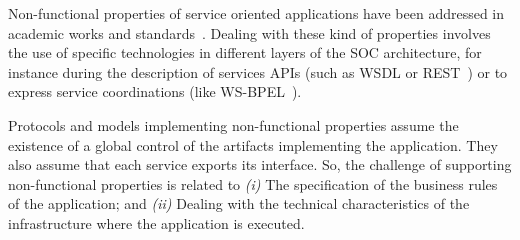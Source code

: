 \bigskip

Non-functional properties of service oriented applications have been
addressed in academic works and standards~\cite{ws-co,ws-tra,wsci}.
Dealing with these kind of properties involves the use of specific technologies
in different layers of the SOC architecture, for instance during the description
of services APIs (such as WSDL\cite{wsdl} or REST~\cite{rest}) or to express
service coordinations (like WS-BPEL~\cite{bpel03}).


Protocols and models implementing non-functional properties assume the existence of a global control of the artifacts implementing the application.
They also assume that each service exports its interface.
So, the challenge of supporting non-functional properties is related to
\textit{(i)} The specification of the business rules of the application; and 
\textit{(ii)} Dealing with the technical characteristics of the infrastructure where the application is executed.

%


